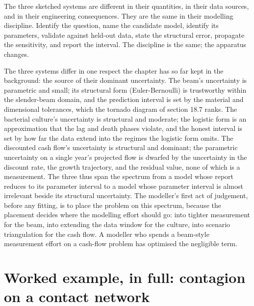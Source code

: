 The three sketched systems are different in their
quantities, in their data sources, and in their engineering
consequences. They are the same in their modelling
discipline. Identify the question, name the candidate
model, identify its parameters, validate against held-out
data, state the structural error, propagate the
sensitivity, and report the interval. The discipline is the
same; the apparatus changes.

\begin{mastery}
The three systems differ in one respect the chapter has so far kept in
the background: the source of their dominant uncertainty. The beam's
uncertainty is parametric and small; its structural form
(Euler-Bernoulli) is trustworthy within the slender-beam domain, and
the prediction interval is set by the material and dimensional
tolerances, which the tornado diagram of section 18.7 ranks. The
bacterial culture's uncertainty is structural and moderate; the
logistic form is an approximation that the lag and death phases violate,
and the honest interval is set by how far the data extend into the
regimes the logistic form omits. The discounted cash flow's uncertainty
is structural and dominant; the parametric uncertainty on a single
year's projected flow is dwarfed by the uncertainty in the discount
rate, the growth trajectory, and the residual value, none of which is a
measurement. The three thus span the spectrum from a model whose report
reduces to its parameter interval to a model whose parameter
interval is almost irrelevant beside its structural uncertainty. The
modeller's first act of judgement, before any fitting, is to place the
problem on this spectrum, because the placement decides where the
modelling effort should go: into tighter measurement for the beam, into
extending the data window for the culture, into scenario triangulation
for the cash flow. A modeller who spends a beam-style measurement effort
on a cash-flow problem has optimised the negligible term.
\end{mastery}

\section{Worked example, in full: contagion on a contact network}

